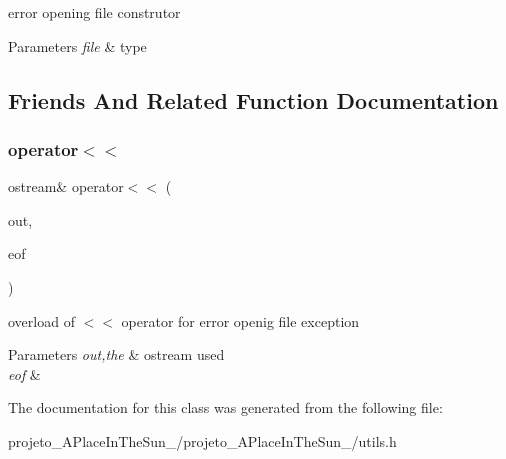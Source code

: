error opening file construtor 


\begin{DoxyParams}{Parameters}
{\em file} & type \\
\hline
\end{DoxyParams}


\subsection{Friends And Related Function Documentation}
\hypertarget{class_error_opening_file_af72ed5066b7bbfc4485454291cb5356c}{}\label{class_error_opening_file_af72ed5066b7bbfc4485454291cb5356c} 
\subsubsection{\texorpdfstring{operator$<$$<$}{operator<<}}
{\footnotesize\ttfamily ostream\& operator$<$$<$ (\begin{DoxyParamCaption}\item[{ostream \&}]{out,  }\item[{\hyperlink{class_error_opening_file}{Error\+Opening\+File} \&}]{eof }\end{DoxyParamCaption})\hspace{0.3cm}{\ttfamily [friend]}}



overload of $<$$<$ operator for error openig file exception 


\begin{DoxyParams}{Parameters}
{\em out,the} & ostream used\\
\hline
{\em eof} & \\
\hline
\end{DoxyParams}


The documentation for this class was generated from the following file\+:\begin{DoxyCompactItemize}
\item 
projeto\+\_\+\+A\+Place\+In\+The\+Sun\+\_/projeto\+\_\+\+A\+Place\+In\+The\+Sun\+\_/utils.\+h\end{DoxyCompactItemize}
